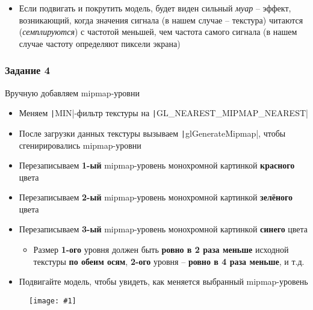 \documentclass[10pt]{beamer}
\newcommand{\slideimage}[1]{
  \begin{figure}
    \begin{adjustbox}{width=\textwidth, totalheight=\textheight-2\baselineskip-2\baselineskip,keepaspectratio}
      \texttt{[image: \#1]}
    \end{adjustbox}
  \end{figure}
}
\begin{document}
\begin{frame}[fragile]
\begin{itemize}
\item Если подвигать и покрутить модель, будет виден сильный \textit{муар} -- эффект, возникающий, когда значения сигнала (в нашем случае -- текстура) читаются (\textit{семплируются}) с частотой меньшей, чем частота самого сигнала (в нашем случае частоту определяют пиксели экрана)
\end{itemize}
\end{frame}

\begin{frame}[fragile]
\frametitle{Задание 4}
Вручную добавляем mipmap-уровни
\begin{itemize}
\item Меняем \texttt|MIN|-фильтр текстуры на \texttt|GL_NEAREST_MIPMAP_NEAREST|
\item После загрузки данных текстуры вызываем \texttt|glGenerateMipmap|, чтобы сгенирировались mipmap-уровни
\item Перезаписываем \textbf{1-ый} mipmap-уровень монохромной картинкой \textbf{\color{red}красного} цвета
\item Перезаписываем \textbf{2-ый} mipmap-уровень монохромной картинкой \textbf{\color{green}зелёного} цвета
\item Перезаписываем \textbf{3-ый} mipmap-уровень монохромной картинкой \textbf{\color{blue}синего} цвета
\begin{itemize}
\item Размер \textbf{1-ого} уровня должен быть \textbf{ровно в 2 раза меньше} исходной текстуры \textbf{по обеим осям}, \textbf{2-ого} уровня -- \textbf{ровно в 4 раза меньше}, и т.д.
\end{itemize}
\item Подвигайте модель, чтобы увидеть, как меняется выбранный mipmap-уровень
\end{itemize}
\end{frame}

\begin{frame}[fragile]
\slideimage{4.png}
\end{frame}
\end{document}
